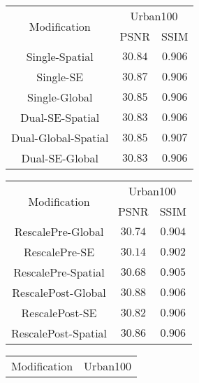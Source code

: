 \documentclass{article}
\begin{document}
\begin{table}[t]
\centering
    \begin{subtable}{.5\linewidth}
      \centering
        \begin{tabular}{ |c|c|c| } 
         \hline
          \multirow{2}{*}{Modification} & \multicolumn{2}{c}{Urban100} \vline\\ 
          
            & PSNR & SSIM \\ 
            Single-Spatial & $30.84$ & $0.906$ \\
            Single-SE & $30.87$ & $0.906$ \\
            Single-Global & $30.85$ & $0.906$ \\
            Dual-SE-Spatial & $30.83$ & $0.906$ \\
            Dual-Global-Spatial & $30.85$ & $0.907$ \\
            Dual-SE-Global & $30.83$ & $0.906$ \\
    
         \hline
        \end{tabular}
    \label{res:table-a}
    \end{subtable}%
    \begin{subtable}{.5\linewidth}
      \centering
        \begin{tabular}{ |c|c|c| } 
         \hline
          \multirow{2}{*}{Modification} & \multicolumn{2}{c}{Urban100} \vline\\ 
          
            & PSNR & SSIM \\ 
            RescalePre-Global & $30.74$ & $0.904$ \\
            RescalePre-SE & $30.14$ & $0.902$ \\
            RescalePre-Spatial & $30.68$ & $0.905$ \\
            RescalePost-Global & $30.88$ & $0.906$ \\
            RescalePost-SE & $30.82$ & $0.906$ \\
            RescalePost-Spatial & $30.86$ & $0.906$ \\
        
         \hline
        \end{tabular}
    \label{res:table-b}
    \end{subtable}
    \begin{subtable}{.5\linewidth}
      \centering
        \begin{tabular}{ |c|c|c| } 
         \hline
          \multirow{2}{*}{Modification} & \multicolumn{2}{c}{Urban100} \vline\\ 
          

\end{tabular}
\end{subtable}
\end{table}
\end{document}
